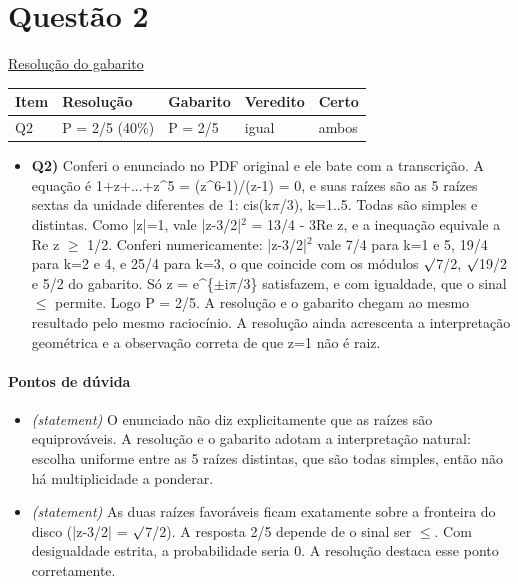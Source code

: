 \documentclass{article}%
\begin{document}
\section*{Questão 2}%
\href{https://poliedroresolve.sistemapoliedro.com.br/vestibulares/ime/2027/ime-2-fase-dia-1-26-10-2026-2-fase-dia-1/dissertativa-2-matematica-2-fase-dia-1-ime-2027}{Resolução do gabarito}\par\smallskip%
\begin{longtable}{@{}p{} p{} p{} p{} p{}@{}}\toprule Item & Resolução & Gabarito & Veredito & Certo \\ \midrule
Q2 & P = 2/5 (40\%) & P = 2/5 & igual & ambos \\
\bottomrule\end{longtable}%
\begin{itemize}%
\item%
\textbf{Q2)} Conferi o enunciado no PDF original e ele bate com a transcrição. A equação é 1+z+...+z\^{}5 = (z\^{}6-1)/(z-1) = 0, e suas raízes são as 5 raízes sextas da unidade diferentes de 1: cis(k$\pi$/3), k=1..5. Todas são simples e distintas. Como |z|=1, vale |z-3/2|$^2$ = 13/4 - 3Re z, e a inequação equivale a Re z $\geq$ 1/2. Conferi numericamente: |z-3/2|$^2$ vale 7/4 para k=1 e 5, 19/4 para k=2 e 4, e 25/4 para k=3, o que coincide com os módulos $\surd$7/2, $\surd$19/2 e 5/2 do gabarito. Só z = e\^{}\{$\pm$i$\pi$/3\} satisfazem, e com igualdade, que o sinal $\leq$ permite. Logo P = 2/5. A resolução e o gabarito chegam ao mesmo resultado pelo mesmo raciocínio. A resolução ainda acrescenta a interpretação geométrica e a observação correta de que z=1 não é raiz.%
\end{itemize}%
\paragraph{Pontos de dúvida}%
\begin{itemize}%
\item%
\textit{(statement)} O enunciado não diz explicitamente que as raízes são equiprováveis. A resolução e o gabarito adotam a interpretação natural: escolha uniforme entre as 5 raízes distintas, que são todas simples, então não há multiplicidade a ponderar.%
\item%
\textit{(statement)} As duas raízes favoráveis ficam exatamente sobre a fronteira do disco (|z-3/2| = $\surd$7/2). A resposta 2/5 depende de o sinal ser $\leq$. Com desigualdade estrita, a probabilidade seria 0. A resolução destaca esse ponto corretamente.%
\end{itemize}%
\end{document}
